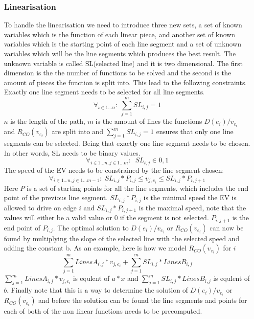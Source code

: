 \subsubsection{Linearisation}
To handle the linearisation we need to introduce three new sets, a set of known variables which is the function of each linear piece, and another set of known variables which is the starting point of each line segment and a set of unknown variables which will be the line segments which produces the best result. The unknown variable is called SL(selected line) and it is two dimensional. The first dimension is the the number of functions to be solved and the second is the amount of pieces the function is split into. This lead to the following constraints.   
Exactly one line segment needs to be selected for all line segments. 
\begin{equation*}
\forall_{i\in1 \dots n }:\; \sum_{j=1}^{m} SL_{i,j} = 1
\end{equation*}
$n$ is the length of the path, $m$ is the amount of lines the functions \( D(e_i)/v_{e_i} \) and $R_{CO}(v_{e_i})$ are split into and $\sum_{j=1}^{m} SL_{i,j} = 1$ ensures that only one line segments can be selected.
Being that exactly one line segment needs to be chosen. In other words, SL needs to be binary values. 
\begin{equation*}
\forall_{i\in1 \dots n, j \in 1 \dots m}: \; \; SL_{i,j} \in{0,1} 
\end{equation*}
The speed of the EV needs to be constrained by the line segment chosen:
\begin{equation*}
\forall_{i\in1 \dots n, j \in 1 \dots m-1}:\; SL_{i,j} * P_{i,j}  \le  v_{j,e_i} \le SL_{i,j}*P_{i,j+1}
\end{equation*}
Here $P$ is a set of starting points for all the line segments, which includes the end point of the previous line segment. $SL_{i,j} * P_{i,j}$ is the minimal speed the EV is allowed to drive on edge $i$ and $SL_{i,j}*P_{i,j+1}$ is the maximal speed, note that the values will either be a valid value or $0$ if the segment is not selected. $P_{i,j+1}$ is the end point of $P_{i,j}$. 
The optimal solution to \( D(e_i)/v_{e_i} \) or $R_{CO}(v_{e_i})$ can now be found by multiplying the slope of the selected line with the selected speed and adding the constant b. As an example, here is how we model $R_{CO}(v_{e_i})$ for $i$
\begin{equation*}
\sum_{j=1}^{m} LinesA_{i,j}*v_{j,e_i} + \sum_{j=1}^{m} SL_{i,j}*LinesB_{i,j} 
\end{equation*}
$\sum_{j=1}^{m} LinesA_{i,j}*v_{j,e_i}$ is equlent of $a*x$ and $\sum_{j=1}^{m} SL_{i,j}*LinesB_{i,j}$ is equlent of $b$. 
Finally note that this is a way to determine the solution of  \( D(e_i)/v_{e_i} \) or $R_{CO}(v_{e_i})$ and before the solution can be found the line segments and points for each of both of the non linear functions needs to be precomputed. 



